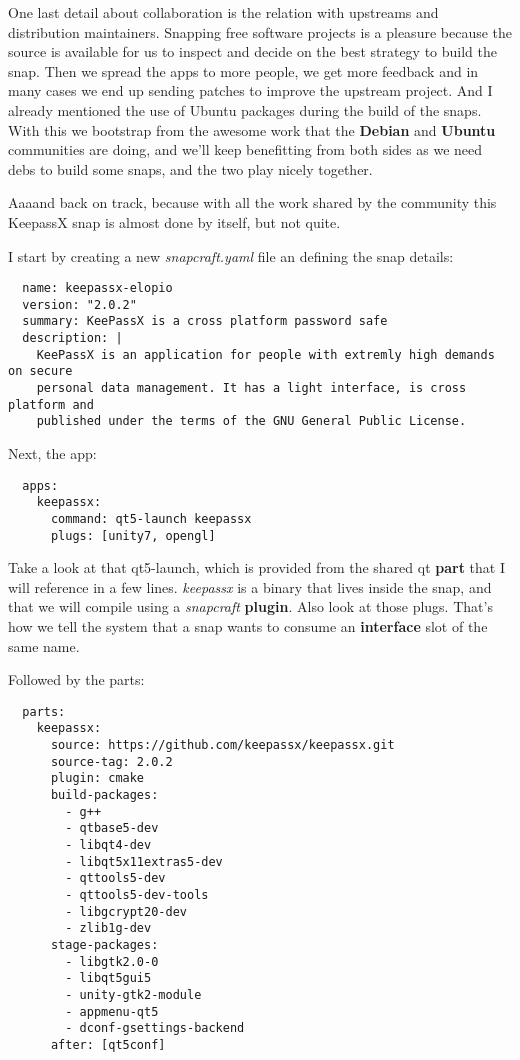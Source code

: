 \documentclass[12pt]{article}
\begin{document}
One last detail about collaboration is the relation with upstreams and
distribution maintainers. Snapping free software projects is a pleasure because
the source is available for us to inspect and decide on the best strategy to
build the snap. Then we spread the apps to more people, we get more feedback and
in many cases we end up sending patches to improve the upstream project. And I
already mentioned the use of Ubuntu packages during the build of the snaps. With
this we bootstrap from the awesome work that the \textbf{Debian} and
\textbf{Ubuntu} communities are doing, and we'll keep benefitting from both
sides as we need debs to build some snaps, and the two play nicely together.

Aaaand back on track, because with all the work shared by the community this
KeepassX snap is almost done by itself, but not quite.

I start by creating a new \emph{snapcraft.yaml} file an defining the snap
details:

\begin{verbatim}
  name: keepassx-elopio
  version: "2.0.2"
  summary: KeePassX is a cross platform password safe
  description: |
    KeePassX is an application for people with extremly high demands on secure
    personal data management. It has a light interface, is cross platform and
    published under the terms of the GNU General Public License.
\end{verbatim}

Next, the app:

\begin{verbatim}
  apps:
    keepassx:
      command: qt5-launch keepassx
      plugs: [unity7, opengl]
\end{verbatim}

Take a look at that qt5-launch, which is provided from the shared qt
\textbf{part} that I will reference in a few lines. \emph{keepassx} is a binary
that lives inside the snap, and that we will compile using a \emph{snapcraft}
\textbf{plugin}. Also look at those plugs. That's how we tell the system that a
snap wants to consume an \textbf{interface} slot of the same name.

Followed by the parts:

\begin{verbatim}
  parts:
    keepassx:
      source: https://github.com/keepassx/keepassx.git
      source-tag: 2.0.2
      plugin: cmake
      build-packages:
        - g++
        - qtbase5-dev
        - libqt4-dev
        - libqt5x11extras5-dev
        - qttools5-dev
        - qttools5-dev-tools
        - libgcrypt20-dev
        - zlib1g-dev
      stage-packages:
        - libgtk2.0-0
        - libqt5gui5
        - unity-gtk2-module
        - appmenu-qt5
        - dconf-gsettings-backend
      after: [qt5conf]
\end{verbatim}
\end{document}
